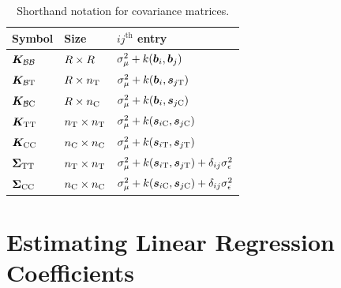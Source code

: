 \documentclass[12pt]{article}
\begin{document}
\begin{appendices}
\begin{table}[tbp]
    \centering
    \bgroup
    \def\arraystretch{1.1}%
    \begin{tabular}{lll}
        \hline
        Symbol & Size                       & \(ij^{\mathrm{th}}\) entry                                                      \\ \hline
        \(\bm{K}_{\mathcal{B} \mathcal{B}}\) & \(R \times R\) & \(\sigmamu^2 + k\del{\sentinel_i,\sentinel_j}\)                                 \\ 
        \(\bm{K}_{\mathcal{B} \mathrm{T}}\) & \(R \times n_{\mathrm{T}}\) & \(\sigmamu^2 + k\del{\sentinel_i,\svec_{j\treat}}\)                             \\ 
        \(\bm{K}_{\mathcal{B} \mathrm{C}}\) & \(R \times n_{\mathrm{C}}\) & \(\sigmamu^2 + k\del{\sentinel_i,\svec_{j\ctrol}}\)                             \\
        \(\bm{K}_{\mathrm{T} \mathrm{T}}\) & \(n_{\mathrm{T}} \times n_{\mathrm{T}}\) & \(\sigmamu^2 + k\del{\svec_{i\ctrol},\svec_{j\ctrol}}\)                         \\
        \(\bm{K}_{\mathrm{C} \mathrm{C}}\) & \(n_{\mathrm{C}} \times n_{\mathrm{C}}\) & \(\sigmamu^2 + k\del{\svec_{i\treat},\svec_{j\treat}}\)                         \\ 
        \(\bm{\Sigma}_{\mathrm{T} \mathrm{T}}\) & \(n_{\mathrm{T}} \times n_{\mathrm{T}}\) & \(\sigmamu^2 + k\del{\svec_{i\treat},\svec_{j\treat}} + \delta_{ij} \sigman^2\) \\ 
        \(\bm{\Sigma}_{\mathrm{C} \mathrm{C}}\) & \(n_{\mathrm{C}} \times n_{\mathrm{C}}\) & \(\sigmamu^2 + k\del{\svec_{i\ctrol},\svec_{j\ctrol}} + \delta_{ij} \sigman^2\) \\
        \hline
    \end{tabular}
    \egroup
    \caption{
        Shorthand notation for covariance matrices.
        \label{table:notation}
    }
\end{table}

\section{Estimating Linear Regression Coefficients}
\label{sec:betahat}


\end{appendices}
\end{document}
